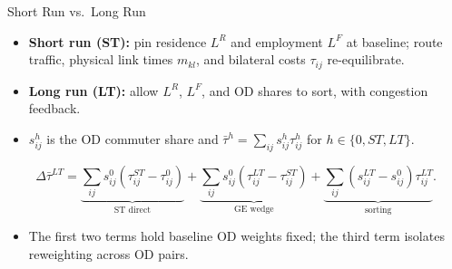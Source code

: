 \documentclass[11pt,aspectratio=169]{beamer}
\begin{document}
\begin{frame}{Short Run vs.\ Long Run}
\small
\begin{itemize}
  \item \textbf{Short run (ST):} pin residence $L^R$ and employment $L^F$ at baseline; route traffic, physical link times $m_{kl}$, and bilateral costs $\tau_{ij}$ re-equilibrate.
  \item \textbf{Long run (LT):} allow $L^R$, $L^F$, and OD shares to sort, with congestion feedback.
  \item $s_{ij}^h$ is the OD commuter share and $\bar\tau^h=\sum_{ij}s_{ij}^h\tau_{ij}^h$ for $h\in\{0,ST,LT\}$.
\end{itemize}
\vspace{-0.55em}
{\footnotesize
  \begin{equation}
    \Delta\bar\tau^{LT}=
    \underbrace{\textstyle\sum_{ij}s_{ij}^0(\tau_{ij}^{ST}\!-\tau_{ij}^0)}_{\text{ST direct}}
    +\underbrace{\textstyle\sum_{ij}s_{ij}^0(\tau_{ij}^{LT}\!-\tau_{ij}^{ST})}_{\text{GE wedge}}
    +\underbrace{\textstyle\sum_{ij}(s_{ij}^{LT}\!-s_{ij}^0)\tau_{ij}^{LT}}_{\text{sorting}}.
  \end{equation}
}
\vspace{-0.8em}
\begin{itemize}\scriptsize
  \item The first two terms hold baseline OD weights fixed; the third term isolates reweighting across OD pairs.
\end{itemize}
\end{frame}
\end{document}
